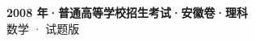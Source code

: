\documentclass[zihao=-4, a4paper]{ctexart}
\begin{document}
\begin{center}
  {\Large\bfseries 2008 年·普通高等学校招生考试·安徽卷·理科}\\[4pt]
  {\large 数学 · 试题版}
\end{center}
\medskip
{}

\end{document}
